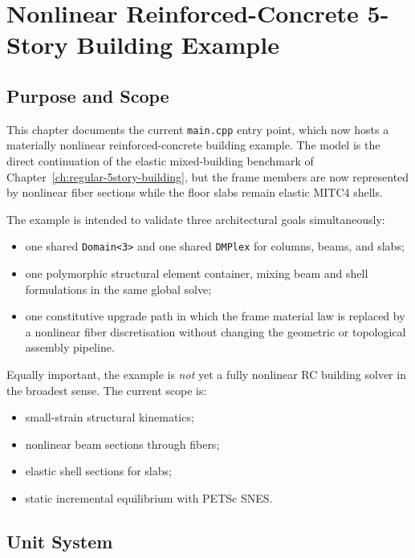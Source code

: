 \chapter{Nonlinear Reinforced-Concrete 5-Story Building Example}
\label{ch:regular-5story-rc-nonlinear-building}

\section{Purpose and Scope}

This chapter documents the current \texttt{main.cpp} entry point, which now
hosts a materially nonlinear reinforced-concrete building example.  The model
is the direct continuation of the elastic mixed-building benchmark of
Chapter~\ref{ch:regular-5story-building}, but the frame members are now
represented by nonlinear fiber sections while the floor slabs remain elastic
MITC4 shells.

The example is intended to validate three architectural goals simultaneously:
\begin{itemize}
  \item one shared \texttt{Domain<3>} and one shared \texttt{DMPlex} for
        columns, beams, and slabs;
  \item one polymorphic structural element container, mixing beam and shell
        formulations in the same global solve;
  \item one constitutive upgrade path in which the frame material law is
        replaced by a nonlinear fiber discretisation without changing the
        geometric or topological assembly pipeline.
\end{itemize}

Equally important, the example is \emph{not} yet a fully nonlinear RC building
solver in the broadest sense.  The current scope is:
\begin{itemize}
  \item small-strain structural kinematics;
  \item nonlinear beam sections through fibers;
  \item elastic shell sections for slabs;
  \item static incremental equilibrium with PETSc SNES.
\end{itemize}

\section{Unit System}

